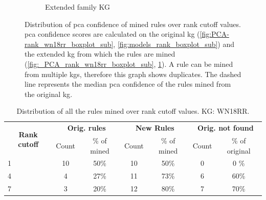 \begin{figure}[!htb]
\begin{subfigure}{.5\textwidth}
  \caption{Extended family KG}
  \label{fig:_PCA_rank_family_boxplot_sub}
\end{subfigure}
\caption[Dist. of PCA conf. of rules over rank cutoff values]{Distribution of \gls{pca} confidence of mined rules over rank cutoff values. \gls{pca} confidence scores are calculated on the original \gls{kg} (\ref{fig:PCA-rank_wn18rr_boxplot_sub}, \ref{fig:models_rank_boxplot_sub}) and the extended \gls{kg} from which the rules are mined (\ref{fig:_PCA_rank_wn18rr_boxplot_sub}, \ref{fig:_PCA_rank_family_boxplot_sub}). A rule can be mined from multiple \glspl{kg}, therefore this graph shows duplicates. The dashed line represents the median \gls{pca} confidence of the rules mined from the original \gls{kg}.}
\label{fig:PCA_rank_boxplot}
\end{figure}


\begin{table}[htp]
\centering
\begin{tabular}{ccccccc}
\multicolumn{1}{c}{\multirow{2}{*}{\textbf{Rank cutoff}}} & \multicolumn{2}{c}{\textbf{Orig. rules}} & \multicolumn{2}{c}{\textbf{New Rules}}   & \multicolumn{2}{c}{\textbf{Orig. not found}} \\
\multicolumn{1}{c}{}                                      & Count & \multicolumn{1}{c|}{\% of mined} & Count & \multicolumn{1}{c|}{\% of mined} & Count            & \% of original            \\ \hline
\multicolumn{1}{l|}{1}                                    & 10    & \multicolumn{1}{c|}{50\%}        & 10    & \multicolumn{1}{c|}{50\%}        & 0                & 0 \%                        \\
\multicolumn{1}{l|}{4}                                    & 4     & \multicolumn{1}{c|}{27\%}        & 11    & \multicolumn{1}{c|}{73\%}        & 6                & 60\%                      \\
\multicolumn{1}{l|}{7}                                    & 3     & \multicolumn{1}{c|}{20\%}        & 12    & \multicolumn{1}{c|}{80\%}        & 7                & 70\%                     
\end{tabular}
\caption[Dist. of rules over rank cutoff - WN18RR KG.]{Distribution of all the rules mined over rank cutoff values. KG: WN18RR.}
\label{Tab:table_rules_ranks_wn18rr}
\end{table}


